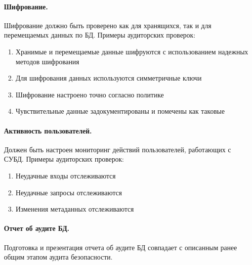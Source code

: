 \paragraph{Шифрование.}

Шифрование должно быть проверено как для хранящихся, так и для перемещаемых данных по БД. Примеры аудиторских проверок:

\begin{enumerate}
	\item Хранимые и перемещаемые данные шифруются с использованием надежных методов шифрования
	\item Для шифрования данных используются симметричные ключи
	\item Шифрование настроено точно согласно политике
	\item Чувствительные данные задокументированы и помечены как таковые
\end{enumerate}

\paragraph{Активность пользователей.}

Должен быть настроен мониторинг действий пользователей, работающих с СУБД. Примеры аудиторских проверок:

\begin{enumerate}
	\item Неудачные входы отслеживаются
	\item Неудачные запросы отслеживаются
	\item Изменения метаданных отслеживаются
\end{enumerate}

\paragraph{Отчет об аудите БД.}

Подготовка и презентация отчета об аудите БД совпадает с описанным ранее общим этапом аудита безопасности.

\clearpage

